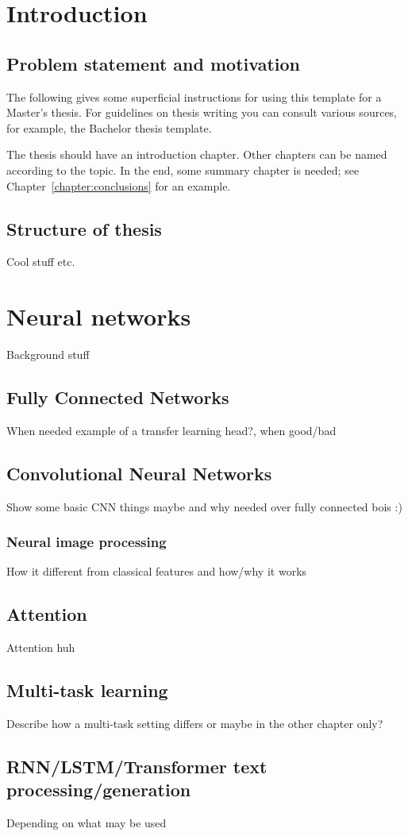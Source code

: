 \chapter{Introduction}
\section{Problem statement and motivation}
The following gives some superficial instructions for using this template for a Master's thesis. For guidelines on thesis writing you can consult various sources, for example, the Bachelor thesis template.

The thesis should have an introduction chapter. Other chapters can be named according to the topic. In the end, some summary chapter is needed; see Chapter~\ref{chapter:conclusions} for an example.

\section{Structure of thesis}
Cool stuff etc.

\chapter{Neural networks}
Background stuff 
\section{Fully Connected Networks}
When needed example of a transfer learning head?, when good/bad
\section{Convolutional Neural Networks}
Show some basic CNN things maybe and why needed over fully connected bois :) 
\subsection{Neural image processing}
How it different from classical features and how/why it works
\section{Attention}
Attention huh
\section{Multi-task learning}
Describe how a multi-task setting differs or maybe in the other chapter only?
\section{RNN/LSTM/Transformer text processing/generation}
Depending on what may be used










